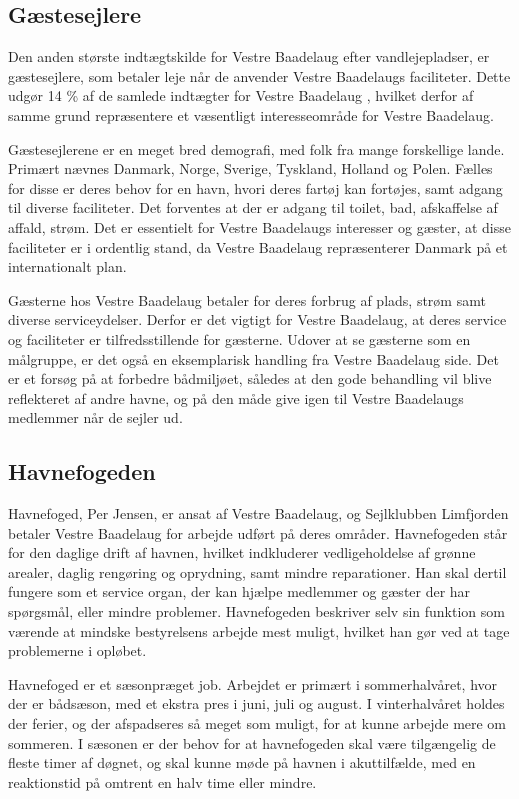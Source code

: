 \subsection{Gæstesejlere}

Den anden største indtægtskilde for Vestre Baadelaug efter vandlejepladser, er gæstesejlere, som betaler leje når de anvender Vestre Baadelaugs faciliteter. Dette udgør 14 \% af de samlede indtægter for Vestre Baadelaug \cite{vestre_arsregnskab}, hvilket derfor af samme grund repræsentere et væsentligt interesseområde for Vestre Baadelaug.

Gæstesejlerene er en meget bred demografi, med folk fra mange forskellige lande. Primært nævnes Danmark, Norge, Sverige, Tyskland, Holland og Polen. Fælles for disse er deres behov for en havn, hvori deres fartøj kan fortøjes, samt adgang til diverse faciliteter. Det forventes at der er adgang til toilet, bad, afskaffelse af affald, strøm. Det er essentielt for Vestre Baadelaugs interesser og gæster, at disse faciliteter er i ordentlig stand, da Vestre Baadelaug repræsenterer Danmark på et internationalt plan.

Gæsterne hos Vestre Baadelaug betaler for deres forbrug af plads, strøm samt diverse serviceydelser. Derfor er det vigtigt for Vestre Baadelaug, at deres service og faciliteter er tilfredsstillende for gæsterne. Udover at se gæsterne som en målgruppe, er det også en eksemplarisk handling fra Vestre Baadelaug side. Det er et forsøg på at forbedre bådmiljøet, således at den gode behandling vil blive reflekteret af andre havne, og på den måde give igen til Vestre Baadelaugs medlemmer når de sejler ud.


\subsection{Havnefogeden}

Havnefoged, Per Jensen, er ansat af Vestre Baadelaug, og Sejlklubben Limfjorden betaler Vestre Baadelaug for arbejde udført på deres områder. Havnefogeden står for den daglige drift af havnen, hvilket indkluderer vedligeholdelse af grønne arealer, daglig rengøring og oprydning, samt mindre reparationer. Han skal dertil fungere som et service organ, der kan hjælpe medlemmer og gæster der har spørgsmål, eller mindre problemer. Havnefogeden beskriver selv sin funktion som værende at mindske bestyrelsens arbejde mest muligt, hvilket han gør ved at tage problemerne i opløbet.

Havnefoged er et sæsonpræget job. Arbejdet er primært i sommerhalvåret, hvor der er bådsæson, med et ekstra pres i juni, juli og august. I vinterhalvåret holdes der ferier, og der afspadseres så meget som muligt, for at kunne arbejde mere om sommeren. I sæsonen er der behov for at havnefogeden skal være tilgængelig de fleste timer af døgnet, og skal kunne møde på havnen i akuttilfælde, med en reaktionstid på omtrent en halv time eller mindre.


